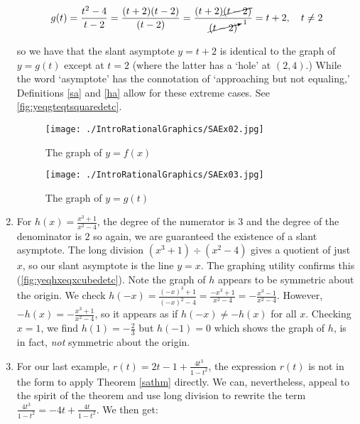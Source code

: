 \begin{ex}
\begin{enumerate}
\[ g(t) = \frac{t^2-4}{t-2} = \frac{(t+2)(t-2)}{(t-2)} = \frac{(t+2) \cancel{(t-2)}}{\cancelto{1}{(t-2)}} = t+2, \quad t \neq 2\]

so we have that the slant asymptote $y=t+2$ is identical to the graph of $y=g(t)$ except at $t=2$ (where the latter has a `hole' at $(2,4)$.) While the word `asymptote' has the connotation of `approaching but not equaling,' Definitions \ref{sa} and  \ref{ha} allow for these extreme cases. See \autoref{fig:yeqgteqtsquaredetc}.

\begin{figure}
\begin{center}

\texttt{[image: ./IntroRationalGraphics/SAEx02.jpg]}
 
\caption{The graph of $y=f(x)$}
\label{fig:yeqfxeqxsquaredetc}
\end{center}
\end{figure}

\begin{figure}
\begin{center}
  
\texttt{[image: ./IntroRationalGraphics/SAEx03.jpg]}

\caption{The graph of $y=g(t)$}
\label{fig:yeqgteqtsquaredetc}
\end{center}
\end{figure}

\item   For $h(x) = \frac{x^3+1}{x^2-4}$, the degree of the numerator is $3$ and the degree of the denominator is $2$ so again, we are guaranteed the existence of a slant asymptote.  The long division $\left(x^3+1 \right) \div \left(x^2-4\right)$ gives a quotient of just $x$, so our slant asymptote is the line $y=x$.  The graphing utility confirms this (\autoref{fig:yeqhxeqxcubedetc}).  Note the graph of $h$ appears to be symmetric about the origin.  We check $h(-x) = \frac{(-x)^3+1}{(-x)^2-4} = \frac{-x^3+1}{x^2-4} = - \frac{x^3-1}{x^2-4}$.  However, $-h(x) = - \frac{x^3+1}{x^2-4}$, so it appears as if $h(-x) \neq -h(x)$ for all $x$.  Checking $x=1$, we find $h(1) = -\frac{2}{3}$ but $h(-1) = 0$ which shows the graph of $h$, is in fact,  \textit{not} symmetric about the origin.

\item  For our last example,  $r(t) = 2t-1+\frac{4t^3}{1-t^2}$, the expression $r(t)$ is not in the form to apply Theorem \ref{sathm} directly.  We can, nevertheless, appeal to the spirit of the theorem and use long division to rewrite the term $\frac{4t^3}{1-t^2} = -4t + \frac{4t}{1-t^2}$.  We then get:


\end{enumerate}
\end{ex}
